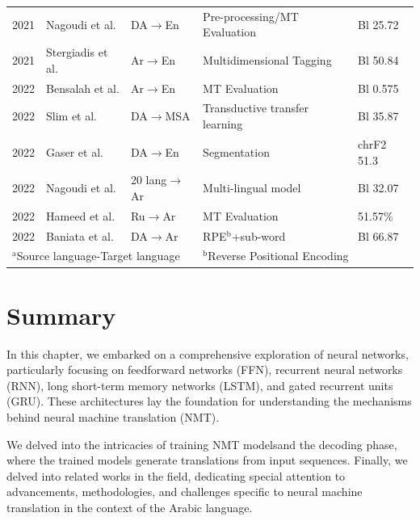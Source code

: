 \begin{small}
\begin{longtable}{|l|l|l|l|l|}
		2021 & Nagoudi et al. \cite{nagoudi21}			& DA$\rightarrow$En &Pre-processing/MT Evaluation& Bl 25.72\\	
		2021 & Stergiadis et al. \cite{stergiadis21}	& Ar$\rightarrow$En &Multidimensional Tagging&Bl 50.84\\	
		2022 & Bensalah et al. \cite{bensalah22}		& Ar$\rightarrow$En &MT Evaluation&Bl 0.575\\	
		2022 & Slim et al. \cite{slim22}				& DA$\rightarrow$MSA &Transductive transfer learning&Bl 35.87\\
		2022 & Gaser et al. \cite{gaser22}				& DA$\rightarrow$En &Segmentation& chrF2 51.3\\
		2022 & Nagoudi et al. \cite{nagoudi22}			& 20 lang$\rightarrow$Ar &Multi-lingual model& Bl 32.07\\
		2022 & Hameed et al. \cite{hameed22}			& Ru$\rightarrow$Ar & MT Evaluation& 51.57\% \\
		2022 & Baniata et al. \cite{baniata22}			& DA$\rightarrow$Ar & RPE$^{\mathrm{b}}$+sub-word & Bl 66.87\\
\hline
\multicolumn{3}{l}{$^{\mathrm{a}}$Source language-Target language}&
\multicolumn{2}{l}{$^{\mathrm{b}}$Reverse Positional Encoding}\\
\end{longtable}
\end{small}

\section{Summary}
In this chapter, we embarked on a comprehensive exploration of neural networks, particularly focusing on feedforward networks (FFN), recurrent neural networks (RNN), long short-term memory networks (LSTM), and gated recurrent units (GRU). 
These architectures lay the foundation for understanding the mechanisms behind neural machine translation (NMT). 

We delved into the intricacies of training NMT modelsand the decoding phase, where the trained models generate translations from input sequences. 
Finally, we delved into related works in the field, dedicating special attention to advancements, methodologies, and challenges specific to neural machine translation in the context of the Arabic language.